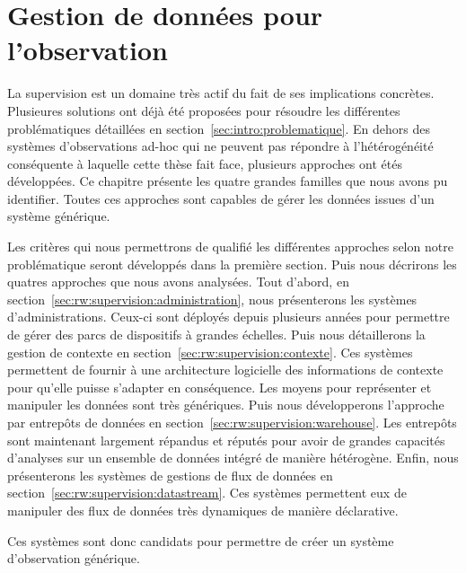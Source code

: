 \chapter{Gestion de données pour l'observation}
\minitoc

La supervision est un domaine très actif du fait de ses implications concrètes. Plusieures solutions ont déjà été proposées pour résoudre les différentes problématiques détaillées en section~\ref{sec:intro:problematique}. En dehors des systèmes d'observations ad-hoc qui ne peuvent pas répondre à l'hétérogénéité conséquente à laquelle cette thèse fait face, plusieurs approches ont étés développées. Ce chapitre présente les quatre grandes familles que nous avons pu identifier. Toutes ces approches sont capables de gérer les données issues d'un système générique.

Les critères qui nous permettrons de qualifié les différentes approches selon notre problématique seront développés dans la première section. Puis nous décrirons les quatres approches que nous avons analysées. Tout d'abord, en section~\ref{sec:rw:supervision:administration}, nous présenterons les systèmes d'administrations. Ceux-ci sont déployés depuis plusieurs années pour permettre de gérer des parcs de dispositifs à grandes échelles. Puis nous détaillerons la gestion de contexte en section~\ref{sec:rw:supervision:contexte}. Ces systèmes permettent de fournir à une architecture logicielle des informations de contexte pour qu'elle puisse s'adapter en conséquence. Les moyens pour représenter et manipuler les données sont très génériques. Puis nous développerons l'approche par entrepôts de données en section~\ref{sec:rw:supervision:warehouse}. Les entrepôts sont maintenant largement répandus et réputés pour avoir de grandes capacités d'analyses sur un ensemble de données intégré de manière hétérogène. Enfin, nous présenterons les systèmes de gestions de flux de données en section~\ref{sec:rw:supervision:datastream}. Ces systèmes permettent eux de manipuler des flux de données très dynamiques de manière déclarative.

Ces systèmes sont donc candidats pour permettre de créer un système d'observation générique.







